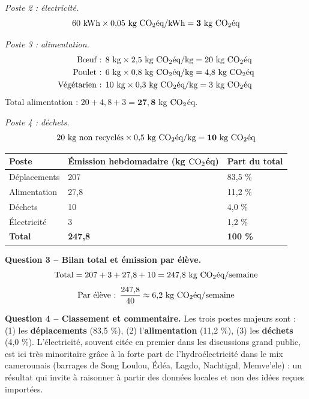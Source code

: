 \documentclass[11pt]{article}
\begin{document}
\begin{exoresolu}
\emph{Poste 2 : électricité.}
\[ 60 \text{ kWh} \times 0{,}05 \text{ kg $\ce{CO2}$éq/kWh} = \mathbf{3} \text{ kg $\ce{CO2}$éq} \]

\emph{Poste 3 : alimentation.}
\begin{align*}
\text{Bœuf : } & 8 \text{ kg} \times 2{,}5 \text{ kg $\ce{CO2}$éq/kg} = 20 \text{ kg $\ce{CO2}$éq} \\
\text{Poulet : } & 6 \text{ kg} \times 0{,}8 \text{ kg $\ce{CO2}$éq/kg} = 4{,}8 \text{ kg $\ce{CO2}$éq} \\
\text{Végétarien : } & 10 \text{ kg} \times 0{,}3 \text{ kg $\ce{CO2}$éq/kg} = 3 \text{ kg $\ce{CO2}$éq}
\end{align*}
Total alimentation : $20 + 4{,}8 + 3 = \mathbf{27{,}8}$ kg $\ce{CO2}$éq.

\emph{Poste 4 : déchets.}
\[ 20 \text{ kg non recyclés} \times 0{,}5 \text{ kg $\ce{CO2}$éq/kg} = \mathbf{10} \text{ kg $\ce{CO2}$éq} \]

\begin{center}
\begin{tabularx}{\linewidth}{|l|X|X|}\hline
\rowcolor{popblueL} \textbf{Poste} & \textbf{Émission hebdomadaire (kg $\ce{CO2}$éq)} & \textbf{Part du total} \\ \hline
Déplacements & 207 & 83,5 \% \\ \hline
Alimentation & 27,8 & 11,2 \% \\ \hline
Déchets & 10 & 4,0 \% \\ \hline
Électricité & 3 & 1,2 \% \\ \hline
\textbf{Total} & \textbf{247,8} & \textbf{100 \%} \\ \hline
\end{tabularx}
\end{center}

\textbf{Question 3 -- Bilan total et émission par élève.}
\[ \text{Total} = 207 + 3 + 27{,}8 + 10 = 247{,}8 \text{ kg $\ce{CO2}$éq/semaine} \]
\[ \text{Par élève : } \frac{247{,}8}{40} \approx 6{,}2 \text{ kg $\ce{CO2}$éq/semaine} \]

\textbf{Question 4 -- Classement et commentaire.} Les trois postes majeurs sont : (1) les \textbf{déplacements} (83,5 \%), (2) l'\textbf{alimentation} (11,2 \%), (3) les \textbf{déchets} (4,0 \%). L'électricité, souvent citée en premier dans les discussions grand public, est ici très minoritaire grâce à la forte part de l'hydroélectricité dans le mix camerounais (barrages de Song Loulou, Édéa, Lagdo, Nachtigal, Memve'ele) : un résultat qui invite à raisonner à partir des données locales et non des idées reçues importées.


\end{exoresolu}
\end{document}
